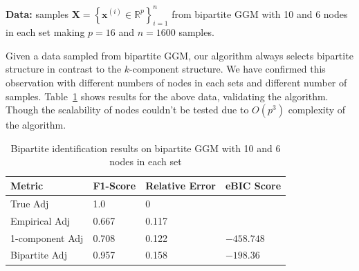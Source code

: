 \textbf{Data:} samples $\mathbf{X}=\left\{\mathbf{x}^{(i)} \in \mathbb{R}^{p}\right\}_{i=1}^{n}$ from bipartite GGM with 10 and 6 nodes in each set making $p=16$ and $n=1600$ samples. 

Given a data sampled from bipartite GGM, our algorithm always selects bipartite structure in contrast to the $k$-component structure. We have confirmed this observation with different numbers of nodes in each sets and different number of samples. Table~\ref{tab:bip-res2} shows results for the above data, validating the algorithm. Though the scalability of nodes couldn't be tested due to $O(p^3)$ complexity of the algorithm.

\begin{table}[htpb]
	\caption{Bipartite identification results on bipartite GGM with 10 and 6 nodes in each set}
	\label{tab:bip-res2}
	\centering
	\begin{tabular}{llll}
		\toprule
		Metric     &   F1-Score  & Relative Error & eBIC Score \\
		\midrule
		True Adj          & 1.0    & 0     &        \\
		Empirical Adj     & 0.667  & 0.117 &        \\
		1-component Adj   & 0.708  & 0.122 & $-458.748$   \\
		Bipartite Adj     & 0.957  & 0.158 & $-198.36$  \\
		\bottomrule
	\end{tabular}
\end{table}